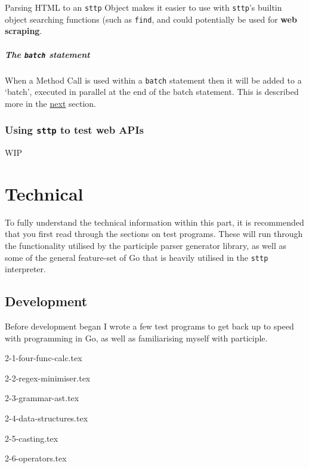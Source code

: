 \documentclass[]{full}
\theoremstyle{definition}
\begin{document}
Parsing HTML to an \verb|sttp| Object makes it easier to use with \verb|sttp|'s builtin object searching functions (such as \verb|find|, and could potentially be used for \textbf{web scraping}.

\cprotect\subsubsection{The \verb|batch| statement}

When a Method Call is used within a \verb|batch| statement then it will be added to a `batch', executed in parallel at the end of the batch statement. This is described more in the \hyperref[sec:batching]{next} section.

\cprotect\section{Using \verb|sttp| to test web APIs}
\label{sec:hello-sttp-using-sttp-to-test}

WIP

\part{Technical}

To fully understand the technical information within this part, it is recommended that you first read through the sections on test programs. These will run through the functionality utilised by the participle parser generator library, as well as some of the general feature-set of Go that is heavily utilised in the \verb|sttp| interpreter.

\chapter{Development}
\label{chap:development}

Before development began I wrote a few test programs to get back up to speed with programming in Go, as well as familiarising myself with participle.

{2-1-four-func-calc.tex}

{2-2-regex-minimiser.tex}

{2-3-grammar-ast.tex}

{2-4-data-structures.tex}

{2-5-casting.tex}

{2-6-operators.tex}
\end{document}
